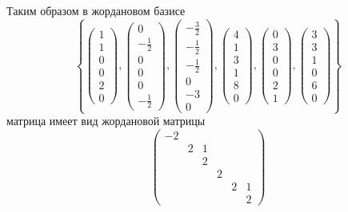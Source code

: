 \documentclass[12pt,a4paper]{article}
\begin{document}
\begin{problem*}
        Таким образом в жордановом базисе
        \[\left\{
            \begin{pmatrix}
                1\\1\\0\\0\\2\\0
            \end{pmatrix},
            \begin{pmatrix}
                0\\-\frac{1}{2}\\0\\0\\0\\-\frac{1}{2}
            \end{pmatrix},
            \begin{pmatrix}
                -\frac{3}{2}\\-\frac{1}{2}\\-\frac{1}{2}\\0\\-3\\0
            \end{pmatrix},
            \begin{pmatrix}
                4\\1\\3\\1\\8\\0
            \end{pmatrix},
            \begin{pmatrix}
                0\\3\\0\\0\\2\\1
            \end{pmatrix},
            \begin{pmatrix}
                3\\3\\1\\0\\6\\0
            \end{pmatrix}
        \right\}\]
        матрица имеет вид жордановой матрицы
        \[
            \begin{pmatrix}
                -2&&&&&\\
                &2& 1&&&\\
                &&2&&&\\
                &&&2&&\\
                &&&&2&1\\
                &&&&&2 
            \end{pmatrix}
        \]
    \end{problem*}
\end{document}
